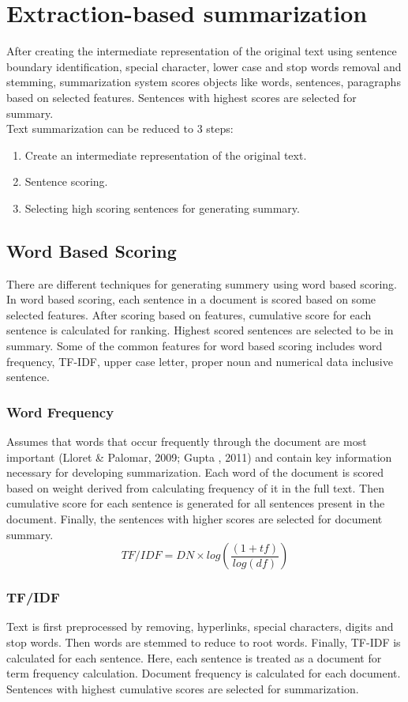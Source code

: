 \documentclass[conference]{IEEEtran}
\begin{document}
\section{Extraction-based summarization}
After creating the intermediate representation of the original text using sentence boundary identification, special character, lower case and stop words removal and stemming, summarization system scores objects like words, sentences, paragraphs based on selected features. Sentences with highest scores are selected for summary.\\
Text summarization can be reduced to 3 steps:
\begin{enumerate}
\item Create an intermediate representation of the original text.
\item Sentence scoring.
\item Selecting high scoring sentences for generating summary.
\end{enumerate}
\subsection{Word Based Scoring}
There are different techniques for generating summery using word based scoring. In word based scoring, each sentence in a document is scored based on some selected features. After scoring based on features, cumulative score for each sentence is calculated for ranking. Highest scored sentences are selected to be in summary. Some of the common features for word based scoring includes word frequency, TF-IDF, upper case letter, proper noun and numerical data inclusive sentence.\\
\subsubsection{Word Frequency}
Assumes that words that occur frequently through the document are most important (Lloret \& Palomar, 2009; Gupta , 2011) and contain key information necessary for developing summarization. Each word of the document is scored based on weight derived from calculating frequency of it in the full text. Then cumulative score for each sentence is generated for all sentences present in the document. Finally, the sentences with higher scores are selected for document summary.\\
$$
TF/IDF = DN \times log(\frac{(1+tf)}{log(df)})
$$
\subsubsection{TF/IDF}
Text is first preprocessed by removing, hyperlinks, special characters, digits and stop words. Then words are stemmed to reduce to root words. Finally, TF-IDF is calculated for each sentence. Here, each sentence is treated as a document for term frequency calculation. Document frequency is calculated for each document. Sentences with highest cumulative scores are selected for summarization.\\
\end{document}
